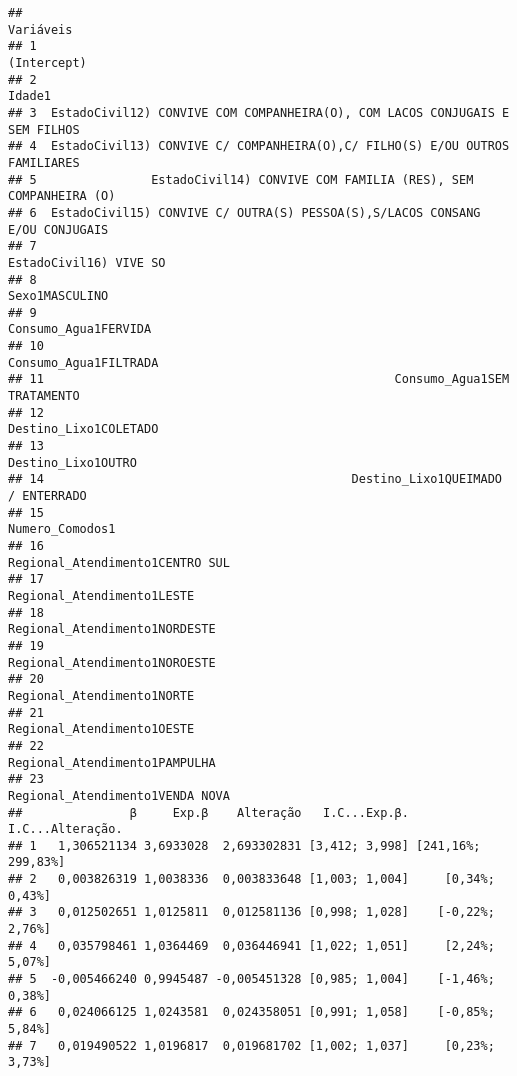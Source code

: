 \documentclass[
]{article}
\begin{document}
\begin{verbatim}
##                                                                      Variáveis
## 1                                                                  (Intercept)
## 2                                                                       Idade1
## 3  EstadoCivil12) CONVIVE COM COMPANHEIRA(O), COM LACOS CONJUGAIS E SEM FILHOS
## 4  EstadoCivil13) CONVIVE C/ COMPANHEIRA(O),C/ FILHO(S) E/OU OUTROS FAMILIARES
## 5                EstadoCivil14) CONVIVE COM FAMILIA (RES), SEM COMPANHEIRA (O)
## 6  EstadoCivil15) CONVIVE C/ OUTRA(S) PESSOA(S),S/LACOS CONSANG E/OU CONJUGAIS
## 7                                                       EstadoCivil16) VIVE SO
## 8                                                               Sexo1MASCULINO
## 9                                                         Consumo_Agua1FERVIDA
## 10                                                       Consumo_Agua1FILTRADA
## 11                                                 Consumo_Agua1SEM TRATAMENTO
## 12                                                       Destino_Lixo1COLETADO
## 13                                                          Destino_Lixo1OUTRO
## 14                                           Destino_Lixo1QUEIMADO / ENTERRADO
## 15                                                             Numero_Comodos1
## 16                                             Regional_Atendimento1CENTRO SUL
## 17                                                  Regional_Atendimento1LESTE
## 18                                               Regional_Atendimento1NORDESTE
## 19                                               Regional_Atendimento1NOROESTE
## 20                                                  Regional_Atendimento1NORTE
## 21                                                  Regional_Atendimento1OESTE
## 22                                               Regional_Atendimento1PAMPULHA
## 23                                             Regional_Atendimento1VENDA NOVA
##               β     Exp.β    Alteração   I.C...Exp.β.   I.C...Alteração.
## 1   1,306521134 3,6933028  2,693302831 [3,412; 3,998] [241,16%; 299,83%]
## 2   0,003826319 1,0038336  0,003833648 [1,003; 1,004]     [0,34%; 0,43%]
## 3   0,012502651 1,0125811  0,012581136 [0,998; 1,028]    [-0,22%; 2,76%]
## 4   0,035798461 1,0364469  0,036446941 [1,022; 1,051]     [2,24%; 5,07%]
## 5  -0,005466240 0,9945487 -0,005451328 [0,985; 1,004]    [-1,46%; 0,38%]
## 6   0,024066125 1,0243581  0,024358051 [0,991; 1,058]    [-0,85%; 5,84%]
## 7   0,019490522 1,0196817  0,019681702 [1,002; 1,037]     [0,23%; 3,73%]

\end{verbatim}
\end{document}
